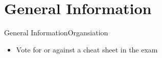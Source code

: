 
\section{General Information}

\begin{frame}{General Information}{Organsiation}
  \begin{itemize}
    \item Vote for or against a \alert{cheat sheet} in the exam
  \end{itemize}
\end{frame}
